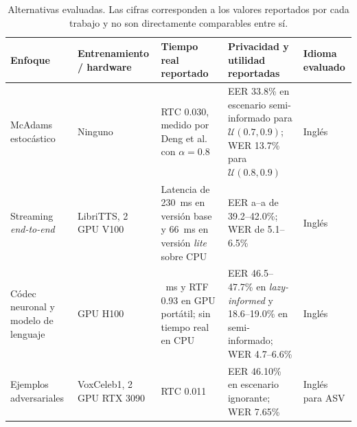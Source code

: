 \documentclass[10pt,twocolumn]{article}
\begin{document}
\begin{table}[t]
    \centering
    \caption{Alternativas evaluadas. Las cifras corresponden a los valores
    reportados por cada trabajo y no son directamente comparables entre sí.}
    \label{tab:alternativas}
    \small
    \renewcommand{\arraystretch}{1.2}

    \begin{tabularx}{\textwidth}{
        >{\raggedright\arraybackslash}p{3.6cm}
        >{\raggedright\arraybackslash}p{3.0cm}
        >{\raggedright\arraybackslash}X
        >{\raggedright\arraybackslash}X
        >{\raggedright\arraybackslash}p{2.4cm}
    }
        \toprule
        \textbf{Enfoque}
        &
        \textbf{Entrenamiento / hardware}
        &
        \textbf{Tiempo real reportado}
        &
        \textbf{Privacidad y utilidad reportadas}
        &
        \textbf{Idioma evaluado}
        \\
        \midrule

        McAdams estocástico \cite{patino2021}
        &
        Ninguno
        &
        RTC 0.030, medido por Deng et al.~\cite{deng2023} con $\alpha=0.8$
        &
        EER 33.8\% en escenario semi-informado para
        $\mathcal{U}(0.7,0.9)$; WER 13.7\% para
        $\mathcal{U}(0.8,0.9)$
        &
        Inglés
        \\

        Streaming \textit{end-to-end} \cite{quamer2024}
        &
        LibriTTS, 2 GPU V100
        &
        Latencia de 230~ms en versión base y 66~ms en versión
        \textit{lite} sobre CPU
        &
        EER a--a de 39.2--42.0\%; WER de 5.1--6.5\%
        &
        Inglés
        \\

        Códec neuronal y modelo de lenguaje \cite{kuzmin2026}
        &
        8 GPU H100
        &
        180~ms y RTF 0.93 en GPU portátil; sin tiempo real en CPU
        &
        EER 46.5--47.7\% en \textit{lazy-informed} y
        18.6--19.0\% en semi-informado; WER 4.7--6.6\%
        &
        Inglés
        \\

        Ejemplos adversariales \cite{deng2023}
        &
        VoxCeleb1, 2 GPU RTX 3090
        &
        RTC 0.011
        &
        EER 46.10\% en escenario ignorante; WER 7.65\%
        &
        Inglés para ASV
        \\
        \bottomrule
    \end{tabularx}
\end{table}
\end{document}
